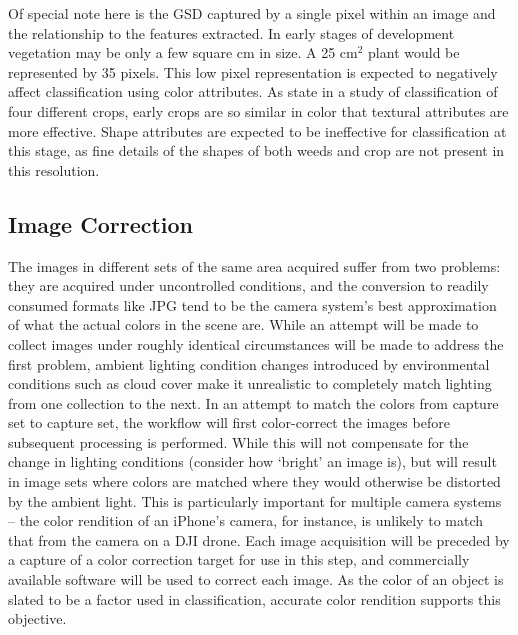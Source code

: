 \documentclass[12pt]{article}
\begin{document}
Of special note here is the GSD captured by a single pixel within an image and the relationship to the features extracted.  In early stages of development vegetation may be only a few square cm in size. A 25 cm$^2$ plant would be represented by 35 pixels. This low pixel representation is expected to negatively affect classification using color attributes. As \citeauthor{Iqbal2021-yx} state in a study of classification of four different crops, early crops are so similar in color that textural attributes are more effective. Shape attributes are expected to be ineffective for classification at this stage, as fine details of the shapes of both weeds and crop are not present in this resolution.

\subsection{Image Correction}
The images in different sets of the same area acquired suffer from two problems: they are acquired under uncontrolled conditions, and the conversion to readily consumed formats like JPG tend to be the camera system's best approximation of what the actual colors in the scene are. While an attempt will be made to collect images under roughly identical circumstances will be made to address the first problem, ambient lighting condition changes introduced by environmental conditions such as cloud cover make it unrealistic to completely match lighting from one collection to the next. In an attempt to match the colors from capture set to capture set, the workflow will first color-correct the images before subsequent processing is performed. While this will not compensate for the change in lighting conditions (consider how `bright' an image is), but will result in image sets where colors are matched where they would otherwise be distorted by the ambient light. This is particularly important for multiple camera systems -- the color rendition of an iPhone's camera, for instance, is unlikely to match that from the camera on a DJI drone. Each image acquisition will be preceded by a capture of a color correction target for use in this step, and commercially available software will be used to correct each image. As the color of an object is slated to be a factor used in classification, accurate color rendition supports this objective.
\end{document}
